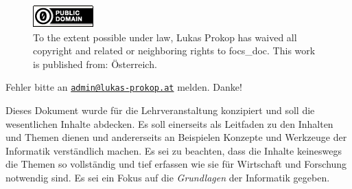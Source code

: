 \begin{titlepage}
  \begin{center}
    \begin{figure}[ht!]
      \begin{center}
        \includegraphics[width=88px,height=33px]{img/cc0.png} \\[20pt]%
        To the extent possible under law, Lukas Prokop has waived all copyright and related
        or neighboring rights to focs\_doc. This work is published from: Österreich. 
      \end{center}
    \end{figure}
    \vspace{50pt}
    \noindent Fehler bitte an
    \href{mailto:admin@lukas-prokop.at}{\nolinkurl{admin@lukas-prokop.at}}
    melden. Danke!
    \vspace{50pt}

    Dieses Dokument wurde für die Lehrveranstaltung \courselfocs{} konzipiert
    und soll die wesentlichen Inhalte abdecken. Es soll einerseits als
    Leitfaden zu den Inhalten und Themen dienen und andererseits an Beispielen
    Konzepte und Werkzeuge der Informatik verständlich machen. Es sei zu beachten,
    dass die Inhalte keineswegs die Themen so vollständig und tief erfassen
    wie sie für Wirtschaft und Forschung notwendig sind. Es sei ein Fokus
    auf die \emph{Grundlagen} der Informatik gegeben.
  \end{center}
\end{titlepage}

